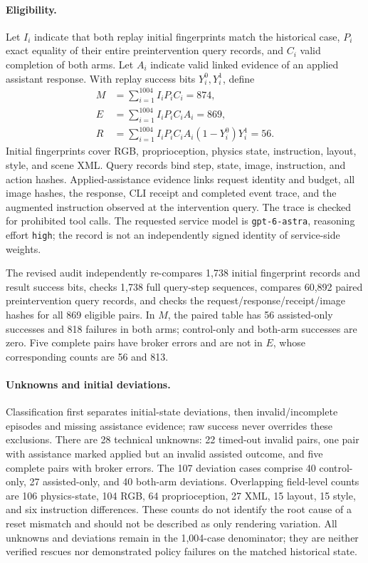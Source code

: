 \paragraph{Eligibility.}
Let $I_i$ indicate that both replay initial fingerprints match the historical case, $P_i$ exact equality of their entire preintervention query records, and $C_i$ valid completion of both arms. Let $A_i$ indicate valid linked evidence of an applied assistant response. With replay success bits $Y_i^0,Y_i^1$, define
\begin{align}
M&=\sum_{i=1}^{1004}I_iP_iC_i=874,\\
E&=\sum_{i=1}^{1004}I_iP_iC_iA_i=869,\\
R&=\sum_{i=1}^{1004}I_iP_iC_iA_i(1-Y_i^0)Y_i^1=56.
\end{align}
Initial fingerprints cover RGB, proprioception, physics state, instruction, layout, style, and scene XML. Query records bind step, state, image, instruction, and action hashes. Applied-assistance evidence links request identity and budget, all image hashes, the response, CLI receipt and completed event trace, and the augmented instruction observed at the intervention query. The trace is checked for prohibited tool calls. The requested service model is \texttt{gpt-6-astra}, reasoning effort \texttt{high}; the record is not an independently signed identity of service-side weights.

The revised audit independently re-compares 1,738 initial fingerprint records and result success bits, checks 1,738 full query-step sequences, compares 60,892 paired preintervention query records, and checks the request/response/receipt/image hashes for all 869 eligible pairs. In $M$, the paired table has 56 assisted-only successes and 818 failures in both arms; control-only and both-arm successes are zero. Five complete pairs have broker errors and are not in $E$, whose corresponding counts are 56 and 813.

\paragraph{Unknowns and initial deviations.}
Classification first separates initial-state deviations, then invalid/incomplete episodes and missing assistance evidence; raw success never overrides these exclusions. There are 28 technical unknowns: 22 timed-out invalid pairs, one pair with assistance marked applied but an invalid assisted outcome, and five complete pairs with broker errors. The 107 deviation cases comprise 40 control-only, 27 assisted-only, and 40 both-arm deviations. Overlapping field-level counts are 106 physics-state, 104 RGB, 64 proprioception, 27 XML, 15 layout, 15 style, and six instruction differences. These counts do not identify the root cause of a reset mismatch and should not be described as only rendering variation. All unknowns and deviations remain in the 1,004-case denominator; they are neither verified rescues nor demonstrated policy failures on the matched historical state.

